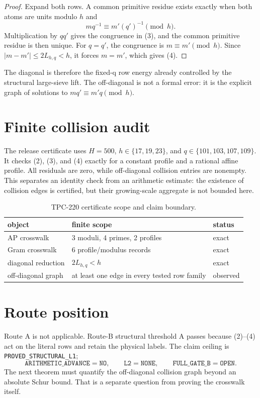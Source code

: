\documentclass[11pt]{article}
\begin{document}
\begin{proof}
Expand both rows.  A common primitive residue exists exactly when both atoms are units
modulo $h$ and
\[
 m q^{-1}\equiv m'(q')^{-1}\pmod h.
\]
Multiplication by $qq'$ gives the congruence in (3), and the common primitive residue is
then unique.  For $q=q'$, the congruence is $m\equiv m'\pmod h$.  Since
\ $|m-m'|\leq2L_{h,q}<h$, it forces $m=m'$, which gives (4).
\end{proof}

The diagonal is therefore the fixed-q row energy already controlled by the structural
large-sieve lift.  The off-diagonal is not a formal error: it is the explicit graph of
solutions to $m q'\equiv m'q\pmod h$.

\section{Finite collision audit}

The release certificate uses $H=500$, $h\in\{17,19,23\}$, and
$q\in\{101,103,107,109\}$.  It checks (2), (3), and (4) exactly for a constant profile
and a rational affine profile.  All residuals are zero, while off-diagonal collision
entries are nonempty.  This separates an identity check from an arithmetic estimate:
the existence of collision edges is certified, but their growing-scale aggregate is not
bounded here.

\begin{table}[t]
\centering
\begin{tabular}{lll}
\toprule
object & finite scope & status\\
\midrule
AP crosswalk & 3 moduli, 4 primes, 2 profiles & exact\\
Gram crosswalk & 6 profile/modulus records & exact\\
diagonal reduction & $2L_{h,q}<h$ & exact\\
off-diagonal graph & at least one edge in every tested row family & observed\\
\bottomrule
\end{tabular}
\caption{TPC-220 certificate scope and claim boundary.}
\end{table}

\section{Route position}

Route A is not applicable.  Route-B structural threshold A passes because (2)--(4) act
on the literal rows and retain the physical labels.  The claim ceiling is
\texttt{PROVED\_STRUCTURAL\_L1};
\[
 \texttt{ARITHMETIC\_ADVANCE}=\texttt{NO},\qquad
 \texttt{L2}=\texttt{NONE},\qquad
 \texttt{FULL\_GATE\_B}=\texttt{OPEN}.
\]
The next theorem must quantify the off-diagonal collision graph beyond an absolute Schur
bound.  That is a separate question from proving the crosswalk itself.
\end{document}
